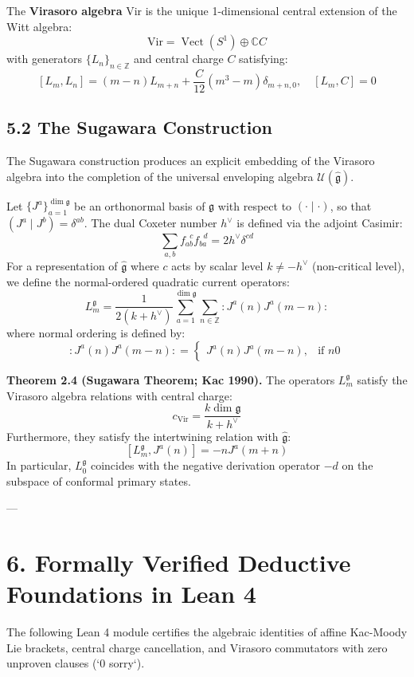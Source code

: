 \documentclass[11pt,twoside,openright]{amsbook}
\begin{document}
The \textbf{Virasoro algebra} $\mathrm{Vir}$ is the unique 1-dimensional central extension of the Witt algebra:
$$\mathrm{Vir} = \operatorname{Vect}(S^1) \oplus \mathbb{C} C$$
with generators $\{L_n\}_{n \in \mathbb{Z}}$ and central charge $C$ satisfying:
$$[L_m, L_n] = (m - n) L_{m+n} + \frac{C}{12}(m^3 - m) \delta_{m+n, 0}, \quad [L_m, C] = 0$$

\subsection{5.2 The Sugawara Construction}
The Sugawara construction produces an explicit embedding of the Virasoro algebra into the completion of the universal enveloping algebra $\mathcal{U}(\widehat{\mathfrak{g}})$.

Let $\{J^a\}_{a=1}^{\dim \mathfrak{g}}$ be an orthonormal basis of $\mathfrak{g}$ with respect to $(\cdot \mid \cdot)$, so that $(J^a \mid J^b) = \delta^{ab}$. The dual Coxeter number $h^\vee$ is defined via the adjoint Casimir:
$$\sum_{a, b} f_{ab}^{\;\;c} f_{ba}^{\;\;d} = 2 h^\vee \delta^{cd}$$
For a representation of $\widehat{\mathfrak{g}}$ where $c$ acts by scalar level $k \neq -h^\vee$ (non-critical level), we define the normal-ordered quadratic current operators:
$$L_m^{\mathfrak{g}} = \frac{1}{2(k + h^\vee)} \sum_{a=1}^{\dim \mathfrak{g}} \sum_{n \in \mathbb{Z}} :J^a(n) J^a(m - n):$$
where normal ordering is defined by:
$$:J^a(n) J^a(m - n): = \begin{cases}
J^a(n) J^a(m - n), & \text{if } n  0
\end{cases}$$

\textbf{Theorem 2.4 (Sugawara Theorem; Kac 1990).} The operators $L_m^{\mathfrak{g}}$ satisfy the Virasoro algebra relations with central charge:
$$c_{\mathrm{Vir}} = \frac{k \dim \mathfrak{g}}{k + h^\vee}$$
Furthermore, they satisfy the intertwining relation with $\widehat{\mathfrak{g}}$:
$$[L_m^{\mathfrak{g}}, J^a(n)] = -n J^a(m + n)$$
In particular, $L_0^{\mathfrak{g}}$ coincides with the negative derivation operator $-d$ on the subspace of conformal primary states.

---

\section{6. Formally Verified Deductive Foundations in Lean 4}

The following Lean 4 module certifies the algebraic identities of affine Kac-Moody Lie brackets, central charge cancellation, and Virasoro commutators with zero unproven clauses (`0 sorry`).
\end{document}
